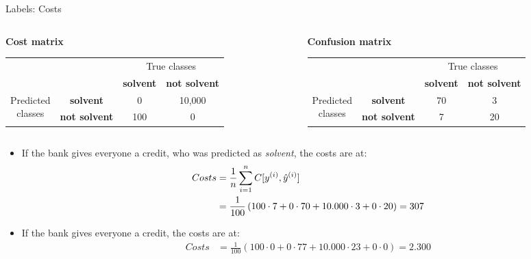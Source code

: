 \documentclass[11pt,compress,t,notes=noshow, xcolor=table]{beamer}
\begin{document}
\begin{vbframe}{Labels: Costs}

\begin{columns}
\begin{column}{0.5\textwidth} 
\footnotesize\textbf{Cost matrix}
 \begin{table}[ht]
 \tiny
\begin{center}
\begin{tabular}{cccc}
    \hline
    & &\multicolumn{2}{c}{True classes} \\ 
    & &\textbf{solvent} & \textbf{not solvent}  \\ 
 \hline
    \multirow{2}{*}{\parbox{0.5cm}{Predicted \\ classes}}& \textbf{solvent}     & 0                 & 10,000\\
    & \textbf{not solvent} & 100               & 0\\
    \hline
\end{tabular}
\end{center}
\end{table}
\end{column}

\begin{column}{0.5\textwidth}
\footnotesize\textbf{Confusion matrix}
 \begin{table}[ht]
 \tiny
\begin{center}
\begin{tabular}{cccc}
    \hline
    & &\multicolumn{2}{c}{True classes} \\ 
    & &\textbf{solvent} & \textbf{not solvent}  \\ 
 \hline
    \multirow{2}{*}{\parbox{0.5cm}{Predicted \\ classes}}& \textbf{solvent}     & 70                 & 3\\
    & \textbf{not solvent} & 7              & 20\\
    \hline
\end{tabular}
\end{center}
\end{table}
\end{column}
\end{columns}


  \begin{itemize}
      \item If the bank gives everyone a credit, who was predicted as \textit{solvent}, the costs are at:
      \begin{align*}
      Costs &= \frac{1}{n} \sum\limits_{i=1}^n C[y^{(i)}, \hat{y}^{(i)}] \\&= 
      \frac{1}{100} \left( 
      100 \cdot 7 + 
      0 \cdot 70 + 
      10.000 \cdot 3 +
      0 \cdot 20 
      \right) = 307
      \end{align*}
    \item If the bank gives everyone a credit, the costs are at:
      \begin{align*}
      Costs &= 
      \frac{1}{100} \left( 
      100 \cdot 0 + 
      0 \cdot 77 + 
      10.000 \cdot 23 +
      0 \cdot 0 
      \right) = 2.300
      \end{align*}
    

\end{itemize}
\end{vbframe}
\end{document}
